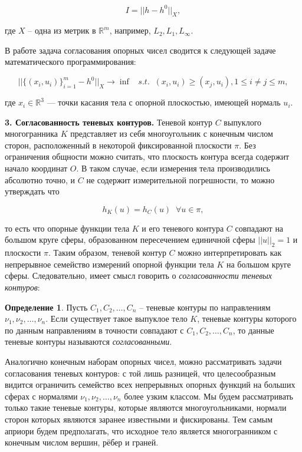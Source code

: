 \documentclass[a4paper, 10pt]{article}
\theoremstyle{definition}
\newtheorem{SmartDefinition}{Определение}
\theoremstyle{plain}
\theoremstyle{plain}
\begin{document}
\begin{equation*}
 I = || h - h^{0} ||_{X},
\end{equation*}

где $X$ -- одна из метрик  в $\mathbb{R}^{m}$, например,
$L_{2}, L_{1}, L_{\infty}$.

В работе \cite{GardnerKiderlen} задача согласования опорных чисел сводится к
следующей задаче математического программирования:

\begin{equation}
\label{equation:gardner-kiderlen}
 ||\{(x_{i}, u_{i})\}_{i = 1}^{m} - h^{0}||_{X} \to \inf \;\;\; s. t. \;\;
 (x_{i}, u_{i}) \geq (x_{j}, u_{i}), 1 \leq i \neq j \leq m,
\end{equation}

где $x_{i} \in \mathbb{R}^{3}$ --- точки касания тела с опорной плоскостью,
имеющей нормаль $u_{i}$.


\textbf{3. Согласованность теневых контуров.}
Теневой контур $C$ выпуклого многогранника $K$ представляет из себя
многоугольник с конечным числом сторон, расположенный в некоторой фиксированной
плоскости $\pi$. Без ограничения общности можно считать, что плоскость контура
всегда содержит начало координат $O$. В таком случае, если измерения тела
производились абсолютно точно, и $C$ не содержит измерительной погрешности, то
можно утверждать что

\begin{equation*}
 h_{K}(u) = h_{C}(u) \;\; \forall u \in \pi,
\end{equation*}

то есть что опорные функции тела $K$ и его теневого контура $C$ совпадают на
большом круге сферы, образованном пересечением единичной сферы $||u||_{2} = 1$
и плоскости $\pi$. Таким образом, теневой контур $C$ можно интерпретировать как
непрерывное семейство измерений опорной функции тела $K$ на большом круге сферы.
Следовательно, имеет смысл говорить о \textit{согласованности теневых контуров}:

\begin{SmartDefinition}
 Пусть $C_{1}, C_{2}, \ldots, C_{n}$ -- теневые контуры по направлениям
 $\nu_{1}, \nu_{2}, \ldots, \nu_{n}$. Если существует такое выпуклое тело $K$,
 теневые контуры которого по данным направлениям в точности совпадают с
 $C_{1}, C_{2}, \ldots, C_{n}$, то данные теневые контуры называются
 \textit{согласованными}.
\end{SmartDefinition}

Аналогично конечным наборам опорных чисел, можно рассматривать задачи
согласования теневых контуров: с той лишь разницей, что целесообразным видится
ограничить семейство всех непрерывных опорных функций на больших сферах с
нормалями $\nu_{1}, \nu_{2}, \ldots, \nu_{n}$ более узким классом. Мы будем
рассматривать только такие теневые контуры, которые являются многоугольниками,
нормали сторон которых являются заранее известными и фискированы. Тем самым
априори будем предполагать, что исходное тело является многогранником с конечным
числом вершин, рёбер и граней.
\end{document}
